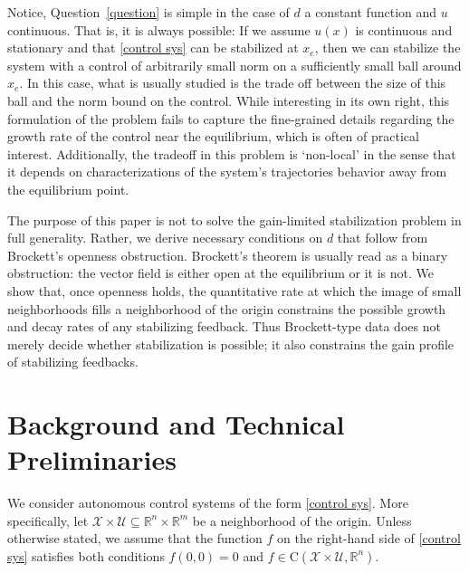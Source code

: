 \documentclass[pdflatex,sn-mathphys-num]{sn-jnl}%
\newcommand{\R}
    {
        \mathbb{R}
    }
\theoremstyle{thmstyleone}%
\theoremstyle{thmstyletwo}%
\theoremstyle{thmstylethree}%
\begin{document}
    
    Notice, Question~\ref{question} is simple in the case of $d$ a constant function and $u$ continuous.  That is, it is always possible:  If we assume $u(x)$ is continuous and stationary and that \eqref{control sys} can be stabilized at $x_e$, then we can stabilize the system with a control of arbitrarily small norm on a sufficiently small ball around $x_e$.  In this case, what is usually studied is the trade off between the size of this ball and the norm bound on the control.  While interesting in its own right, this formulation of the problem fails to capture the fine-grained details regarding the growth rate of the control near the equilibrium, which is often of practical interest.  Additionally, the tradeoff in this problem is `non-local' in the sense that it depends on characterizations of the system's trajectories behavior away from the equilibrium point. 
    
    The purpose of this paper is not to solve the gain-limited stabilization problem in full generality.  Rather, we derive necessary conditions on \(d\) that follow from Brockett's openness obstruction.  Brockett's theorem is usually read as a binary obstruction: the vector field is either open at the equilibrium or it is not.  We show that, once openness holds, the quantitative rate at which the image of small neighborhoods fills a neighborhood of the origin constrains the possible growth and decay rates of any stabilizing feedback.  Thus Brockett-type data does not merely decide whether stabilization is possible; it also constrains the gain profile of stabilizing feedbacks.


\section{Background and Technical Preliminaries}

    
    We consider autonomous control systems of the form \eqref{control sys}.  More specifically, let  $\mathcal{X} \times \mathcal{U} \subseteq \R^n \times \R^m$ be a neighborhood of the origin. Unless otherwise stated, we assume that the function $f$ on the right-hand side of \eqref{control sys} satisfies both conditions $f(0,0)=0$ and $f \in \mathrm{C}\left (\mathcal{X} \times \mathcal{U}, \R^n\right )$.
\end{document}
